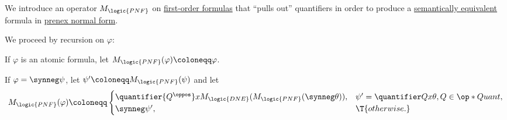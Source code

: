 \begin{algorithm}\label{alg:fol_formula_to_prenex_normal_form}
  We introduce an operator \( M_{\logic{PNF}} \) on \hyperref[def:fol_formula]{first-order formulas} that \enquote{pulls out} quantifiers in order to produce a \hyperref[def:fol_semantics/equivalence]{semantically equivalent} formula in \hyperref[def:fol_prenex_normal_form]{prenex normal form}.

  We proceed by recursion on \( \varphi \):
  \begin{thmenum}
     If \( \varphi \) is an atomic formula, let \( M_{\logic{PNF}}(\varphi) \coloneqq \varphi \).

     If \( \varphi = \synneg \psi \), let \( \psi' \coloneqq M_{\logic{PNF}}(\psi) \) and let
    \begin{equation*}
      M_{\logic{PNF}}(\varphi) \coloneqq \begin{cases}
        \quantifier {Q^\oppos} x M_{\logic{DNE}}(M_{\logic{PNF}}(\synneg \theta)), &\psi' = \quantifier Q x \theta, Q \in \op*{Quant}, \\
        \synneg \psi',                                                               &\T{otherwise.}
      \end{cases}
    \end{equation*}


\end{thmenum}
\end{algorithm}
